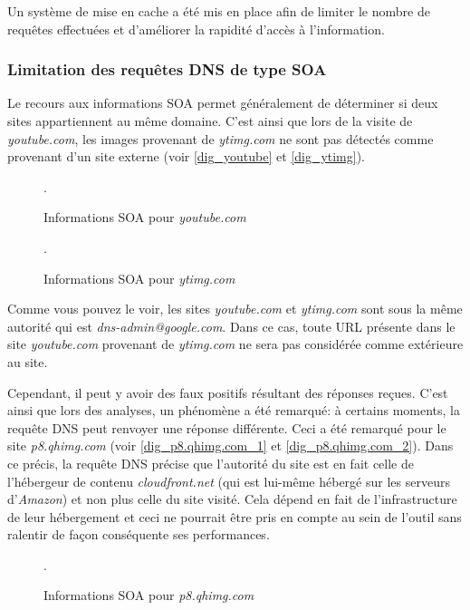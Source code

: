 Un système de mise en cache a été mis en place afin de limiter le nombre de requêtes effectuées et d'améliorer la rapidité d'accès à l'information.

\subsubsection{Limitation des requêtes DNS de type SOA}
Le recours aux informations SOA permet généralement de déterminer si deux sites appartiennent au même domaine. C'est ainsi que lors de la visite de \textit{youtube.com}, les images provenant de \textit{ytimg.com} ne sont pas détectés comme provenant d'un site externe (voir \autoref{dig_youtube} et \autoref{dig_ytimg}).

\begin{figure}[h]
	\centering
	
	\caption{\label{dig_youtube}Informations SOA pour \textit{youtube.com}}.
\end{figure}

\begin{figure}[h]
	\centering
	
	\caption{\label{dig_ytimg}Informations SOA pour \textit{ytimg.com}}.
\end{figure}
Comme vous pouvez le voir, les sites \textit{youtube.com} et \textit{ytimg.com} sont sous la même autorité qui est \textit{dns-admin@google.com}. Dans ce cas, toute URL présente dans le site \textit{youtube.com} provenant de \textit{ytimg.com} ne sera pas considérée comme extérieure au site.
\newline

Cependant, il peut y avoir des faux positifs résultant des réponses reçues. C'est ainsi que lors des analyses, un phénomène a été remarqué: à certains moments, la requête DNS peut renvoyer une réponse différente. Ceci a été remarqué pour le site \textit{p8.qhimg.com} (voir \autoref{dig_p8.qhimg.com_1} et \autoref{dig_p8.qhimg.com_2}). Dans ce précis, la requête DNS précise que l'autorité du site est en fait celle de l'hébergeur de contenu \textit{cloudfront.net} (qui est lui-même hébergé sur les serveurs d'\textit{Amazon}) et non plus celle du site visité. Cela dépend en fait de l'infrastructure de leur hébergement et ceci ne pourrait être pris en compte au sein de l'outil sans ralentir de façon conséquente ses performances.

\begin{figure}[h]
	\centering
	
	\caption{\label{dig_p8.qhimg.com_1}Informations SOA pour \textit{p8.qhimg.com}}.
\end{figure}


